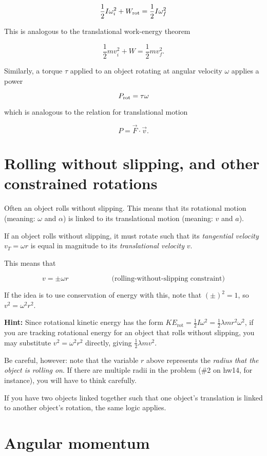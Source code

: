 \documentclass[10pt]{article}
\begin{document}
$$\frac{1}{2}I\omega_i^2 + W_{\rm rot} = \frac{1}{2}I\omega_f^2$$

This is analogous to the translational work-energy theorem

$$\frac{1}{2}mv_i^2 + W = \frac{1}{2}mv_f^2.$$

Similarly, a torque $\tau$ applied to an object rotating at angular velocity $\omega$ applies a power 

$$P_{\rm rot} = \tau \omega$$

which is analogous to the relation for translational motion

$$P=\vec F \cdot \vec v.$$

\section{Rolling without slipping, and other constrained rotations}

Often an object rolls without slipping. This means that its rotational motion (meaning: $\omega$ and $\alpha$) is linked to its translational motion (meaning: $v$ and $a$).

If an object rolls without slipping, it must rotate such that its {\it tangential velocity} $v_T = \omega r$ is equal in magnitude to its {\it translational velocity} $v$.

This means that 

$$ v = \pm \omega r \hspace{1in} \text{(rolling-without-slipping constraint)} $$

If the idea is to use conservation of energy with this, note that $(\pm)^2 = 1$, so $v^2 = \omega^2 r^2$.

{\bf Hint:} Since rotational kinetic energy has the form $KE_{\text{rot}} = \frac{1}{2}I\omega^2 = \frac{1}{2}\lambda mr^2 \omega^2$, if you are tracking 
rotational energy for an object that rolls without slipping, you may substitute $v^2 = \omega^2 r^2$ directly, giving $\frac{1}{2}\lambda mv^2$.

Be careful, however: note that the variable $r$ above represents the {\it radius that the object is rolling on}. If there are multiple radii in the problem (\#2 on hw14, for instance), you will have to think carefully.

If you have two objects linked together such that one object's translation is linked to another object's rotation, the same logic applies.

\section{Angular momentum}
\end{document}
